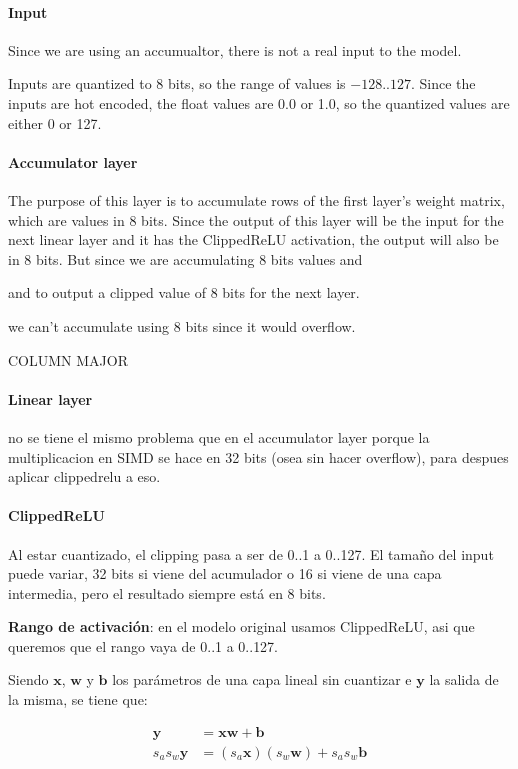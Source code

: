 \paragraph[short]{Input} Since we are using an accumualtor, there is not a real input to the model.

Inputs are quantized to 8 bits, so the range of values is $-128..127$. Since the inputs are hot encoded, the float values are 0.0 or 1.0, so the quantized values are either 0 or 127.

\paragraph[short]{Accumulator layer} The purpose of this layer is to accumulate rows of the first layer's weight matrix, which are values in 8 bits. Since the output of this layer will be the input for the next linear layer and it has the ClippedReLU activation, the output will also be in 8 bits.
But since we are accumulating 8 bits values and


and to output a clipped value of 8 bits for the next layer.

we can't accumulate using 8 bits since it would overflow.

COLUMN MAJOR

\paragraph[short]{Linear layer} no se tiene el mismo problema que en el accumulator layer porque la multiplicacion en SIMD se hace en 32 bits (osea sin hacer overflow), para despues aplicar clippedrelu a eso.

\paragraph[short]{ClippedReLU} Al estar cuantizado, el clipping pasa a ser de 0..1 a 0..127. El tamaño del input puede variar, 32 bits si viene del acumulador o 16 si viene de una capa intermedia, pero el resultado siempre está en 8 bits.

\textbf{Rango de activación}: en el modelo original usamos ClippedReLU, asi que queremos que el rango vaya de 0..1 a 0..127.


Siendo $\bm{x}$, $\bm{w}$ y $\bm{b}$ los parámetros de una capa lineal sin cuantizar e $\bm{y}$ la salida de la misma, se tiene que:

\begin{equation}
\begin{aligned}
\bm{y} &= \bm{x} \bm{w} + \bm{b} \\
s_a s_w \bm{y} &= (s_a \bm{x}) (s_w \bm{w}) + s_a s_w \bm{b} \\
\end{aligned}
\end{equation}



